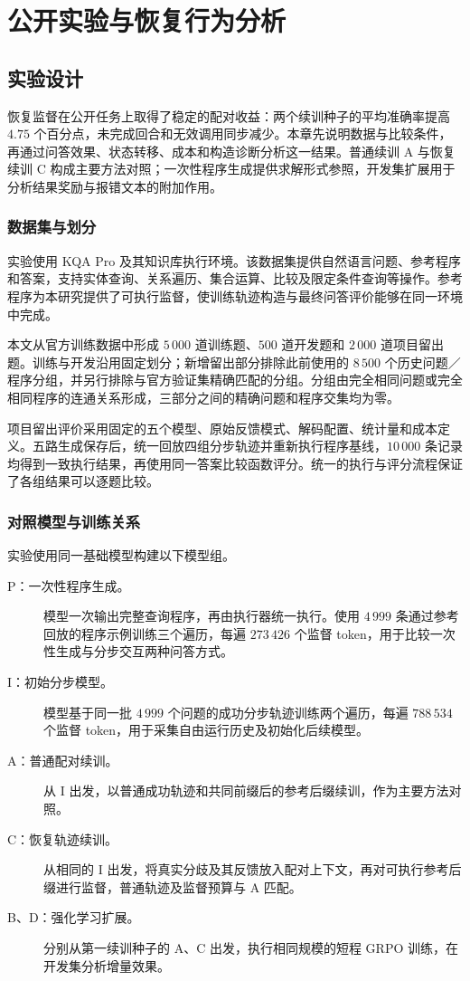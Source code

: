 \chapter{公开实验与恢复行为分析}
\label{chap:public-experiments}

\section{实验设计}

恢复监督在公开任务上取得了稳定的配对收益：两个续训种子的平均准确率提高 $4.75$ 个百分点，未完成回合和无效调用同步减少。本章先说明数据与比较条件，再通过问答效果、状态转移、成本和构造诊断分析这一结果。普通续训 A 与恢复续训 C 构成主要方法对照；一次性程序生成提供求解形式参照，开发集扩展用于分析结果奖励与报错文本的附加作用。

\subsection{数据集与划分}

实验使用 KQA Pro\cite{cao2022kqapro} 及其知识库执行环境。该数据集提供自然语言问题、参考程序和答案，支持实体查询、关系遍历、集合运算、比较及限定条件查询等操作。参考程序为本研究提供了可执行监督，使训练轨迹构造与最终问答评价能够在同一环境中完成。

本文从官方训练数据中形成 $5\,000$ 道训练题、$500$ 道开发题和 $2\,000$ 道项目留出题。训练与开发沿用固定划分；新增留出部分排除此前使用的 $8\,500$ 个历史问题／程序分组，并另行排除与官方验证集精确匹配的分组。分组由完全相同问题或完全相同程序的连通关系形成，三部分之间的精确问题和程序交集均为零。

项目留出评价采用固定的五个模型、原始反馈模式、解码配置、统计量和成本定义。五路生成保存后，统一回放四组分步轨迹并重新执行程序基线，$10\,000$ 条记录均得到一致执行结果，再使用同一答案比较函数评分。统一的执行与评分流程保证了各组结果可以逐题比较。

\subsection{对照模型与训练关系}

实验使用同一基础模型构建以下模型组。
\begin{description}
  \item[P：一次性程序生成。] 模型一次输出完整查询程序，再由执行器统一执行。使用 $4\,999$ 条通过参考回放的程序示例训练三个遍历，每遍 $273\,426$ 个监督 token，用于比较一次性生成与分步交互两种问答方式。
  \item[I：初始分步模型。] 模型基于同一批 $4\,999$ 个问题的成功分步轨迹训练两个遍历，每遍 $788\,534$ 个监督 token，用于采集自由运行历史及初始化后续模型。
  \item[A：普通配对续训。] 从 I 出发，以普通成功轨迹和共同前缀后的参考后缀续训，作为主要方法对照。
  \item[C：恢复轨迹续训。] 从相同的 I 出发，将真实分歧及其反馈放入配对上下文，再对可执行参考后缀进行监督，普通轨迹及监督预算与 A 匹配。
  \item[B、D：强化学习扩展。] 分别从第一续训种子的 A、C 出发，执行相同规模的短程 GRPO 训练，在开发集分析增量效果。
\end{description}

